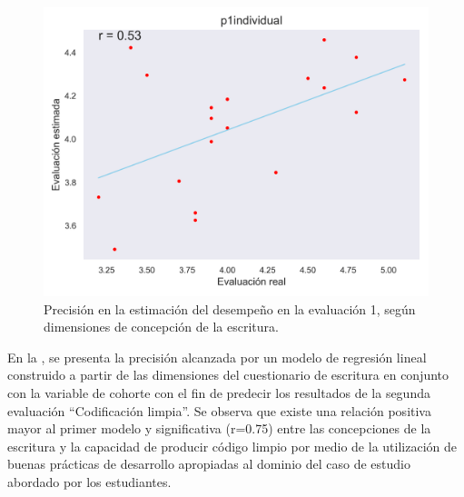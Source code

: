 \documentclass[spanish]{textolivre}
\begin{document}
\begin{figure}[H]
\centering
\begin{minipage}{.75\textwidth}
 \includegraphics[width=\textwidth]{figuras/figura7.png}
 \caption{Precisión en la estimación del desempeño en la evaluación 1, según dimensiones de concepción de la escritura.}
 \label{fig-modelo1}
\end{minipage}
\end{figure}

En la , se presenta la precisión alcanzada por un modelo de regresión lineal construido a partir de las dimensiones del cuestionario de escritura en conjunto con la variable de cohorte con el fin de predecir los resultados de la segunda evaluación “Codificación limpia”. Se observa que existe una relación positiva mayor al primer modelo y significativa (r=0.75) entre las concepciones de la escritura y la capacidad de producir código limpio por medio de la utilización de buenas prácticas de desarrollo apropiadas al dominio del caso de estudio abordado por los estudiantes. 
\end{document}
